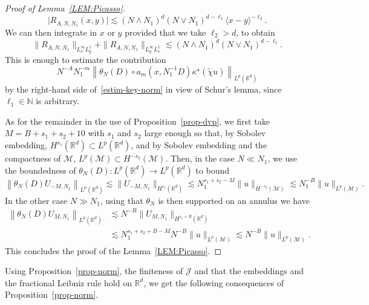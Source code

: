 \documentclass[10pt]{amsart}
\theoremstyle{definition}\newtheorem{defi}[theo]{Definition}\newtheorem{rema}[theo]{Remark}\newtheorem{exam}[theo]{Example}\newtheorem{exem}[theo]{Example}\newtheorem{nota}[theo]{Notation}
\newcommand{\R}{\mathbb{R}}
\newcommand{\N}{\mathbb{N}}
\newcommand{\J}{\mathcal{J}}
\newcommand{\M}{\mathcal{M}}
\newcommand{\kk}{\kappa}
\newcommand{\wt}{\widetilde}
\newcommand{\les}{\lesssim}
\newcommand{\jb}[1] {\langle #1 \rangle}
\begin{document}
\begin{proof}[Proof of Lemma~\ref{LEM:Picasso}]
\begin{equation*}
\big|R_{A,N,N_1}(x,y)\big|\les (N\wedge N_1)^d(N\vee N_1)^{d-\ell_1}\jb{x-y}^{-\ell_2}.
\end{equation*}
We can then integrate in $x$ or $y$ provided that we take $\ell_2>d$, to obtain
\begin{equation*}
\|R_{A,N,N_1}\|_{L^{\infty}_x L^1_y}+\|R_{A,N,N_1}\|_{L^{\infty}_yL^1_x }\les (N\wedge N_1)^{d}(N\vee N_1)^{d-\ell_1}.
\end{equation*}
This is enough to estimate the contribution
\begin{equation*}
N^{-A}N_1^{-m}\left\|\theta_N(D)\circ a_{m}\left(x,N_1^{-1}D\right)\kk^{\star}(\wt\chi u)\right\|_{L^p(\R^d)}
\end{equation*}
by the right-hand side of~\eqref{estim-key-norm} in view of Schur's lemma, since $\ell_1\in\N$ is arbitrary.

As for the remainder in the use of Proposition~\ref{prop-dvp}, we first take $M=B+s_1+s_2+10$ with $s_1$ and $s_2$ large enough so that, by Sobolev embedding, $H^{s_1}(\R^d)\subset L^p(\R^d)$, and by Sobolev embedding and the compactness of $\M$, $L^p(\M)\subset H^{-s_2}(\M)$. Then, in the case $N\ll N_1$, we use the boundedness of $\theta_N(D): L^p(\R^d)\rightarrow L^p(\R^d)$ to bound
\begin{equation*}
\left\|\theta_N(D)U_{-M,N_1}\right\|_{L^p(\R^d)}\les \|U_{-M,N_1}\|_{H^{s_1}(\R^d)}\les N_1^{s_1+s_2-M}\|u\|_{H^{-s_2}(\M)} \les N_1^{-B}\|u\|_{L^p(\M)}.
\end{equation*}
In the other case $N\gg N_1$, using that $\theta_N$ is then supported on an annulus we have
\begin{align*}
\left\|\theta_N(D)U_{M,N_1}\right\|_{L^p(\R^d)}&\les N^{-B}\|U_{M,N_1}\|_{H^{s_1+B}(\R^d)}\\
&\les N_1^{s_1+s_2+B-M} N^{-B}\|u\|_{L^p(\M)}\les N^{-B}\|u\|_{L^p(\M)}.
\end{align*}
This concludes the proof of the Lemma~\ref{LEM:Picasso}.
\end{proof}

Using Proposition~\ref{prop-norm}, the finiteness of $\J$ and that the embeddings and the fractional Leibniz rule hold on $\R^d$, we get the following consequences of Proposition~\ref{prop-norm}.
\end{document}
